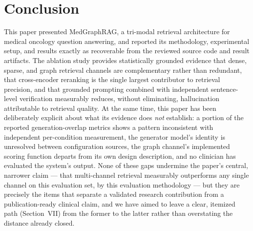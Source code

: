 \documentclass[conference]{IEEEtran}
\begin{document}
\section{Conclusion}
This paper presented MedGraphRAG, a tri-modal retrieval architecture for medical oncology question answering, and reported its methodology, experimental setup, and results exactly as recoverable from the reviewed source code and result artifacts. The ablation study provides statistically grounded evidence that dense, sparse, and graph retrieval channels are complementary rather than redundant, that cross-encoder reranking is the single largest contributor to retrieval precision, and that grounded prompting combined with independent sentence-level verification measurably reduces, without eliminating, hallucination attributable to retrieval quality. At the same time, this paper has been deliberately explicit about what its evidence does \emph{not} establish: a portion of the reported generation-overlap metrics shows a pattern inconsistent with independent per-condition measurement, the generator model's identity is unresolved between configuration sources, the graph channel's implemented scoring function departs from its own design description, and no clinician has evaluated the system's output. None of these gaps undermine the paper's central, narrower claim --- that multi-channel retrieval measurably outperforms any single channel on this evaluation set, by this evaluation methodology --- but they are precisely the items that separate a validated research contribution from a publication-ready clinical claim, and we have aimed to leave a clear, itemized path (Section~VII) from the former to the latter rather than overstating the distance already closed.
\end{document}
